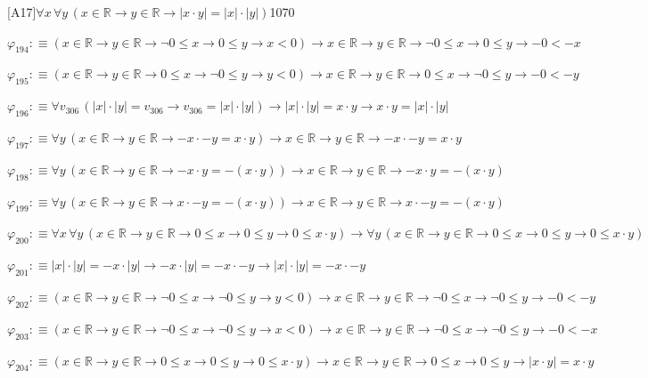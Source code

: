 \begin{fullproof}{[A17]}{$\forall x\,\forall y\,(x \in \mathbb{R} \to y \in \mathbb{R} \to \lvert x \cdot y \rvert = \lvert x \rvert \cdot \lvert y \rvert)$}{1070}
\begin{abbrevlist}
\item $\varphi_{194} :\equiv (x \in \mathbb{R} \to y \in \mathbb{R} \to \neg 0 \leq x \to 0 \leq y \to x < 0) \to x \in \mathbb{R} \to y \in \mathbb{R} \to \neg 0 \leq x \to 0 \leq y \to -0 < -x$
\item $\varphi_{195} :\equiv (x \in \mathbb{R} \to y \in \mathbb{R} \to 0 \leq x \to \neg 0 \leq y \to y < 0) \to x \in \mathbb{R} \to y \in \mathbb{R} \to 0 \leq x \to \neg 0 \leq y \to -0 < -y$
\item $\varphi_{196} :\equiv \forall v_{306}\,(\lvert x \rvert \cdot \lvert y \rvert = v_{306} \to v_{306} = \lvert x \rvert \cdot \lvert y \rvert) \to \lvert x \rvert \cdot \lvert y \rvert = x \cdot y \to x \cdot y = \lvert x \rvert \cdot \lvert y \rvert$
\item $\varphi_{197} :\equiv \forall y\,(x \in \mathbb{R} \to y \in \mathbb{R} \to -x \cdot -y = x \cdot y) \to x \in \mathbb{R} \to y \in \mathbb{R} \to -x \cdot -y = x \cdot y$
\item $\varphi_{198} :\equiv \forall y\,(x \in \mathbb{R} \to y \in \mathbb{R} \to -x \cdot y = -(x \cdot y)) \to x \in \mathbb{R} \to y \in \mathbb{R} \to -x \cdot y = -(x \cdot y)$
\item $\varphi_{199} :\equiv \forall y\,(x \in \mathbb{R} \to y \in \mathbb{R} \to x \cdot -y = -(x \cdot y)) \to x \in \mathbb{R} \to y \in \mathbb{R} \to x \cdot -y = -(x \cdot y)$
\item $\varphi_{200} :\equiv \forall x\,\forall y\,(x \in \mathbb{R} \to y \in \mathbb{R} \to 0 \leq x \to 0 \leq y \to 0 \leq x \cdot y) \to \forall y\,(x \in \mathbb{R} \to y \in \mathbb{R} \to 0 \leq x \to 0 \leq y \to 0 \leq x \cdot y)$
\item $\varphi_{201} :\equiv \lvert x \rvert \cdot \lvert y \rvert = -x \cdot \lvert y \rvert \to -x \cdot \lvert y \rvert = -x \cdot -y \to \lvert x \rvert \cdot \lvert y \rvert = -x \cdot -y$
\item $\varphi_{202} :\equiv (x \in \mathbb{R} \to y \in \mathbb{R} \to \neg 0 \leq x \to \neg 0 \leq y \to y < 0) \to x \in \mathbb{R} \to y \in \mathbb{R} \to \neg 0 \leq x \to \neg 0 \leq y \to -0 < -y$
\item $\varphi_{203} :\equiv (x \in \mathbb{R} \to y \in \mathbb{R} \to \neg 0 \leq x \to \neg 0 \leq y \to x < 0) \to x \in \mathbb{R} \to y \in \mathbb{R} \to \neg 0 \leq x \to \neg 0 \leq y \to -0 < -x$
\item $\varphi_{204} :\equiv (x \in \mathbb{R} \to y \in \mathbb{R} \to 0 \leq x \to 0 \leq y \to 0 \leq x \cdot y) \to x \in \mathbb{R} \to y \in \mathbb{R} \to 0 \leq x \to 0 \leq y \to \lvert x \cdot y \rvert = x \cdot y$

\end{abbrevlist}
\end{fullproof}
